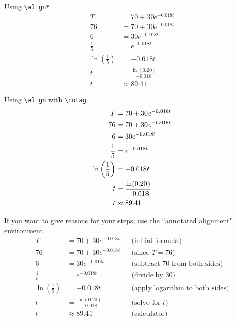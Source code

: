 \documentclass[12pt]{article}
\theoremstyle{definition}
\begin{document}
Using \verb!\align*!
\begin{align*}
T&=70+30 e^{-0.018t}\\
76&=70+30 e^{-0.018t}\\
6&=30 e^{-0.018t}\\
\frac{1}{5}&=e^{-0.018t}\\
\ln\left(\frac{1}{5}\right)&=-0.018t\\
t&=\frac{\ln(0.20)}{-0.018}\\
t&\approx 89.41
\end{align*}

Using \verb!\align! with \verb!\notag!
\begin{align}
T&=70+30 e^{-0.018t}\\
76&=70+30 e^{-0.018t}\notag \\
6&=30 e^{-0.018t}\notag \\
\frac{1}{5}&=e^{-0.018t}\notag \\
\ln\left(\frac{1}{5}\right)&=-0.018t\\
t&=\frac{\ln(0.20)}{-0.018}\notag \\
t&\approx 89.41
\end{align}

\newpage
\noindent

If you want to give reasons for your steps, use the ``annotated alignment" environment.
\begin{align*}
T&=70+30 e^{-0.018t} && \text{(initial formula)} \\
76&=70+30 e^{-0.018t} && \text{(since $T=76$)} \\
6&=30 e^{-0.018t} && \text{(subtract $70$ from both sides)} \\
\frac{1}{5}&=e^{-0.018t} && \text{(divide by $30$)} \\
\ln\left(\frac{1}{5}\right)&=-0.018t && \text{(apply logarithm to both sides)} \\
t&=\frac{\ln(0.20)}{-0.018} && \text{(solve for $t$)}\\
t&\approx 89.41 && \text{(calculator)}
\end{align*}
\end{document}
